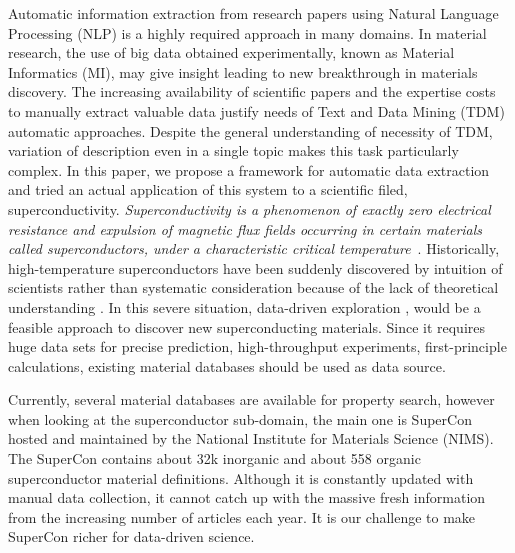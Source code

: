 \documentclass{article}[a4]
\begin{document}
Automatic information extraction from research papers using Natural Language Processing (NLP) is a highly required approach in many domains. In material research, the use of big data obtained experimentally, known as Material Informatics (MI), may give insight leading to new breakthrough in materials discovery. 
The increasing availability of scientific papers and the expertise costs to manually extract valuable data justify needs of Text and Data Mining (TDM) automatic approaches. Despite the general understanding of necessity of TDM, variation of description even in a single topic makes this task particularly complex. 
In this paper, we propose a framework for automatic data extraction and tried an actual application of this system to a scientific filed, superconductivity.  
\textit{Superconductivity is a phenomenon of exactly zero electrical resistance and expulsion of magnetic flux fields occurring in certain materials called superconductors, under a characteristic critical temperature}~\cite{wikipedia:superconductivity}. 
Historically, high-temperature superconductors have been suddenly discovered by intuition of scientists rather than systematic consideration because of the lack of theoretical understanding \cite{klintenberg2013possible} \cite{DBLP:journals/corr/abs-1812-01995}. In this severe situation, data-driven exploration \cite{doi:10.1080/14686996.2018.1548885}, \cite{HAMIDIEH2018346} \cite{PhysRevMaterials.2.024802} \cite{doi:10.1021/cm503507h} would be a feasible approach to discover new superconducting materials. Since it requires huge data sets for precise prediction, high-throughput experiments, first-principle calculations, existing material databases should be used as data source. 


Currently, several material databases are available for property search, however when looking at the superconductor sub-domain, the main one is SuperCon~\cite{SuperCon} hosted and maintained by the National Institute for Materials Science (NIMS). The SuperCon contains about 32k inorganic and about 558 organic superconductor material definitions. Although it is constantly updated with manual data collection, it cannot catch up with the massive fresh information from the increasing number of articles each year. It is our challenge to make SuperCon richer for data-driven science.
\end{document}

